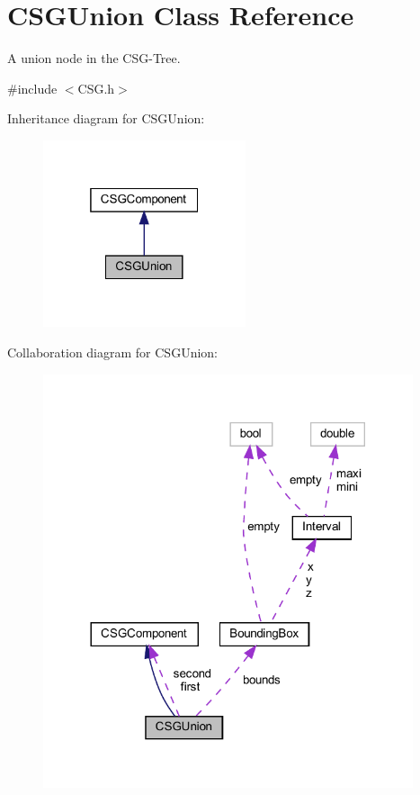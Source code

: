 \hypertarget{classCSGUnion}{}\section{C\+S\+G\+Union Class Reference}
\label{classCSGUnion}


A union node in the C\+S\+G-\/\+Tree.  




{\ttfamily \#include $<$C\+S\+G.\+h$>$}



Inheritance diagram for C\+S\+G\+Union\+:
\nopagebreak
\begin{figure}[H]
\begin{center}
\leavevmode
\includegraphics[width=169pt]{classCSGUnion__inherit__graph}
\end{center}
\end{figure}


Collaboration diagram for C\+S\+G\+Union\+:
\nopagebreak
\begin{figure}[H]
\begin{center}
\leavevmode
\includegraphics[width=308pt]{classCSGUnion__coll__graph}
\end{center}
\end{figure}
